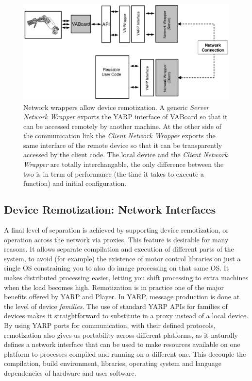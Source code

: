 \begin{figure}[tbp]
\centerline{
\includegraphics[width=24cm]{fig-devices3}
}
\caption{Network wrappers allow device remotization. A generic 
\emph{Server Network Wrapper} exports the YARP interface of VABoard so 
that it can be accessed remotely by another machine. At the 
other side of the 
communication link the \emph{Client Network Wrapper} exports the same 
interface of the remote device so that it can be transparently accessed 
by the client code. The local device and the \emph{Client Network Wrapper}
 are totally interchangable, the only difference between the two is in 
term of performance (the time it takes to execute a function) and
initial configuration.
}\label{fig:devices3}
\end{figure}


\subsection{Device Remotization: Network Interfaces}
%
A final level of separation is achieved by supporting device remotization,
or operation across the network via proxies.
This feature is desirable for many reasons. It 
allows separate compilation and
execution of different parts of the system, to avoid (for example)
 the existence of motor control libraries on just a single OS
constraining you to also do image processing on that same OS.
It makes distributed processing easier, letting you shift
processing to extra machines when the load becomes high.
%
Remotization is in practice one of the major benefits offered by
YARP and Player.  
%
%
In YARP, message production is done at the level of device {\it families}.
%
The use of standard YARP APIs for families of devices
makes it straightforward to substitute in a proxy
instead of a local device.
%
%
By using YARP ports for communication, with their defined protocols,
remotization also gives us portability across different platforms, as 
it naturally defines a network interface that can 
be used to make resources available on one platform to processes compiled 
and running on a different one. This decouple the compilation, build 
environment, libraries, operating system and language dependencies of 
hardware and user software.

